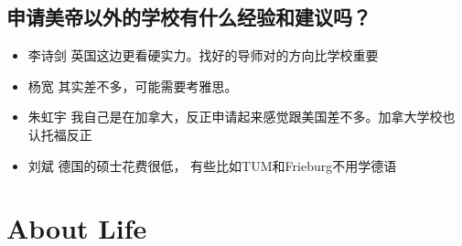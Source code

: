 \documentclass{vivid_layout}
\begin{document}
\subsection{申请美帝以外的学校有什么经验和建议吗？}
\begin{itemize}
\item  { 李诗剑}  \quad 英国这边更看硬实力。找好的导师对的方向比学校重要
\item  { 杨宽}  \quad 其实差不多，可能需要考雅思。
\item  { 朱虹宇}  \quad 我自己是在加拿大，反正申请起来感觉跟美国差不多。加拿大学校也认托福反正
\item  { 刘斌}  \quad 德国的硕士花费很低， 有些比如TUM和Frieburg不用学德语
\end{itemize}

\section{About Life}
\addtocounter{section}{1}
\setcounter{subsection}{0}
\end{document}
